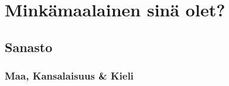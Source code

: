 \documentclass[../päätiedosto/pää.tex]{subfiles}
\begin{document}
 \chapter{Minkämaalainen sinä olet?}

 \section{Sanasto}
 \subsection{Maa, Kansalaisuus \& Kieli}

 
\end{document}
